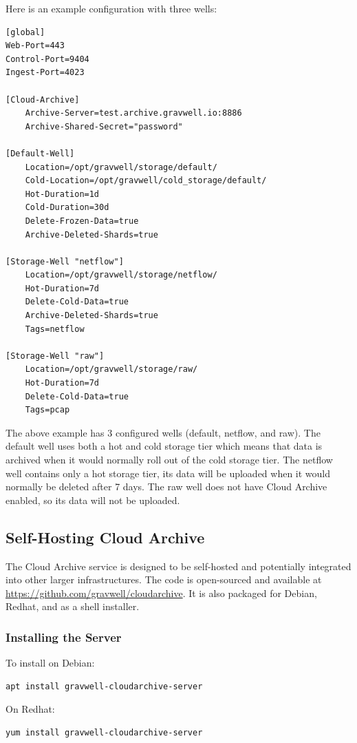 {{Here is an example configuration with three wells:

\begin{verbatim}
[global]
Web-Port=443
Control-Port=9404
Ingest-Port=4023

[Cloud-Archive]
	Archive-Server=test.archive.gravwell.io:8886
	Archive-Shared-Secret="password"

[Default-Well]
	Location=/opt/gravwell/storage/default/
	Cold-Location=/opt/gravwell/cold_storage/default/
	Hot-Duration=1d
	Cold-Duration=30d
	Delete-Frozen-Data=true
	Archive-Deleted-Shards=true

[Storage-Well "netflow"]
	Location=/opt/gravwell/storage/netflow/
	Hot-Duration=7d
	Delete-Cold-Data=true
	Archive-Deleted-Shards=true
	Tags=netflow

[Storage-Well "raw"]
	Location=/opt/gravwell/storage/raw/
	Hot-Duration=7d
	Delete-Cold-Data=true
	Tags=pcap
\end{verbatim}

The above example has 3 configured wells (default, netflow, and raw).  The default well uses both a hot and cold storage tier which means that data is archived when it would normally roll out of the cold storage tier.  The netflow well contains only a hot storage tier, its data will be uploaded when it would normally be deleted after 7 days.  The raw well does not have Cloud Archive enabled, so its data will not be uploaded.

\subsection{Self-Hosting Cloud Archive}

The Cloud Archive service is designed to be self-hosted and potentially integrated into other larger infrastructures. The code is open-sourced and available at \href{github.com/gravwell/cloudarchive}{https://github.com/gravwell/cloudarchive}. It is also packaged for Debian, Redhat, and as a shell installer.

\subsubsection{Installing the Server}
To install on Debian:

\begin{verbatim}
apt install gravwell-cloudarchive-server
\end{verbatim}

On Redhat:

\begin{verbatim}
yum install gravwell-cloudarchive-server
\end{verbatim}

}}
